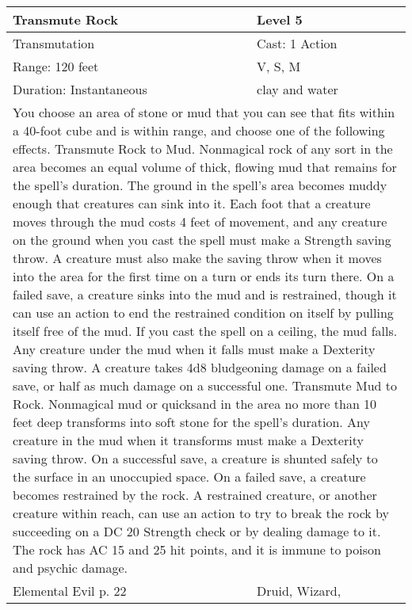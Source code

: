 \documentclass[11pt]{report}
\begin{document}
\begin{table}[H]
	\begin{tabular}{||p{6cm}|p{6cm}||}
		\hline\hline
		\bf{Transmute Rock} & Level 5\\ \hline
		Transmutation & Cast: 1 Action\\ \hline
		Range: 120 feet & V, S, M\\ \hline
		Duration: Instantaneous & clay and water\\ \hline
		\multicolumn{2}{||p{12cm}||}{You choose an area of stone or mud that you can see that fits within a 40-foot cube and is within range, and choose one of the following effects.
Transmute Rock to Mud. Nonmagical rock of any sort in the area becomes an equal volume of thick, flowing mud that remains for the spell’s duration.
The ground in the spell’s area becomes muddy enough that creatures can sink into it. Each foot that a creature moves through the mud costs 4 feet of movement, and any creature on the ground when you cast the spell must make a Strength saving throw. A creature must also make the saving throw when it moves into the area for the first time on a turn or ends its turn there. On a failed save, a creature sinks into the mud and is restrained, though it can use an action to end the restrained condition on itself by pulling itself free of the mud.
If you cast the spell on a ceiling, the mud falls. Any creature under the mud when it falls must make a Dexterity saving throw. A creature takes 4d8 bludgeoning damage on a failed save, or half as much damage on a successful one.
Transmute Mud to Rock. Nonmagical mud or quicksand in the area no more than 10 feet deep transforms into soft stone for the spell’s duration. Any creature in the mud when it transforms must make a Dexterity saving throw. On a successful save, a creature is shunted safely to the surface in an unoccupied space. On a failed save, a creature becomes restrained by the rock. A restrained creature, or another creature within reach, can use an action to try to break the rock by succeeding on a DC 20 Strength check or by dealing damage to it. The rock has AC 15 and 25 hit points, and it is immune to poison and psychic damage.}\\ \hline
Elemental Evil p. 22 & Druid, Wizard, \\ \hline\hline
	\end{tabular}
\end{table}
\end{document}
